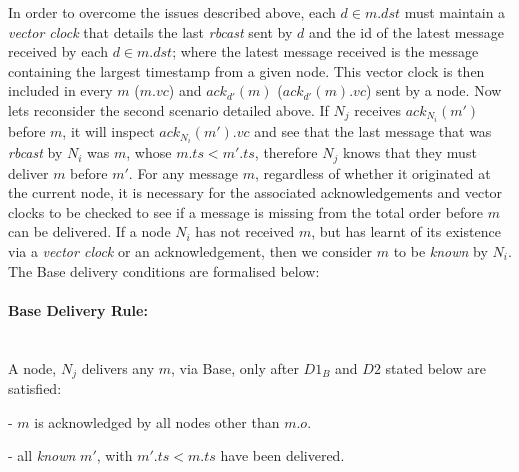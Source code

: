     In order to overcome the issues described above, each $d \in m.dst$ must maintain a \emph{vector clock}\citep{Mattern88virtualtime, fidge1988timestamps} that details the last \emph{rbcast} sent by $d$ and the id of the latest message received by each $d \in m.dst$; where the latest message received is the message containing the largest timestamp from a given node.  This vector clock is then included in every $m$ ($m.vc$) and $ack_{d'}(m)$ ($ack_{d'}(m).vc$) sent by a node.  Now lets reconsider the second scenario detailed above.  If $N_j$ receives $ack_{N_i}(m')$ before $m$, it will inspect $ack_{N_i}(m').vc$ and see that the last message that was \emph{rbcast} by $N_i$ was $m$, whose $m.ts < m'.ts$, therefore $N_j$ knows that they must deliver $m$ before $m'$.  For any message $m$, regardless of whether it originated at the current node, it is necessary for the associated acknowledgements and vector clocks to be checked to see if a message is missing from the total order before $m$ can be delivered.  If a node $N_i$ has not received $m$, but has learnt of its existence via a \emph{vector clock} or an acknowledgement, then we consider $m$ to be \emph{known} by $N_i$.  The \textsf{Base} delivery conditions are formalised below:
    
    \paragraph{\textsf{Base} Delivery Rule:}\hspace{0pt} \\
	    A node, $N_j$ delivers any $m$, via \textsf{Base}, only after $D1_B$ and $D2$ stated below are satisfied:
	    \begin{description}[labelindent=1cm]
	        \item[$\boldsymbol{D1_B}$] - $m$ is acknowledged by all nodes other than $m.o$. 
	        \item[$\boldsymbol{D2}$] - all \emph{known} $m'$, with $m'.ts < m.ts$ have been delivered.
	    \end{description}
    
